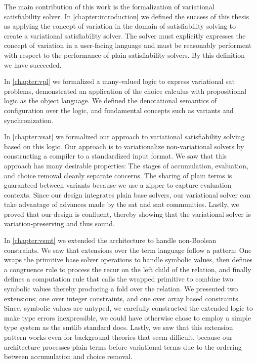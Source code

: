 \label{section:conclusion:cont-summary}

The main contribution of this work is the formalization of variational
satisfiability solver. In \autoref{chapter:introduction} we defined the success
of this thesis as applying the concept of variation in the domain of
satisfiability solving to create a variational satisfiability solver. The solver
must explicitly expresses the concept of variation in a user-facing language and
must be reasonably performent with respect to the performance of plain
satisfiability solvers. By this definition we have succeeded.

In \autoref{chapter:vpl} we formalized a many-valued logic to express
variational \ac{sat} problems, demonstrated an application of the choice
calculus with propositional logic as the object language. We defined the
denotational semantics of configuration over the logic, and fundamental concepts
such as variants and synchronization.

In \autoref{chapter:vsat} we formalized our approach to variational
satisfiability solving based on this logic. Our approach is to variationalize
non-variational solvers by constructing a compiler to a standardized input
format. We saw that this approach has many desirable properties: The stages of
accumulation, evaluation, and choice removal cleanly separate concerns. The
sharing of plain terms is guaranteed between variants because we use a zipper to
capture evaluation contexts. Since our design integrates plain base solvers, our
variational solver can take advantage of advances made by the \ac{sat} and
\ac{smt} communities. Lastly, we proved that our design is confluent, thereby
showing that the variational solver is variation-preserving and thus sound.

In \autoref{chapter:vsmt} we extended the architecture to handle non-Boolean
constraints. We saw that extensions over the term language follow a pattern: One
wraps the primitive base solver operations to handle symbolic values, then
defines a congruence rule to process the recur on the left child of the
relation, and finally defines a computation rule that calls the wrapped
primitive to combine two symbolic values thereby producing a fold over the
relation. We presented two extensions; one over integer constraints, and one
over array based constraints. Since, symbolic values are untyped, we carefully
constructed the extended logic to make type errors inexpressible, we could have
otherwise chose to employ a simple type system as the \acl{smtlib} standard
does. Lastly, we saw that this extension pattern works even for background
theories that seem difficult, because our architecture processes plain terms
before variational terms due to the ordering between accumulation and choice
removal.

